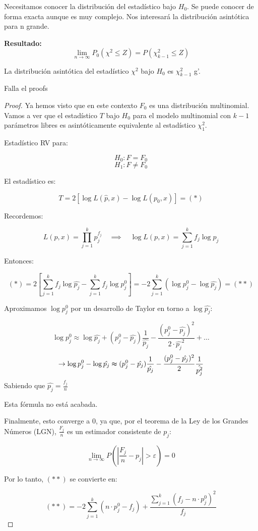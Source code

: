  Necesitamos conocer la distribución del estadístico bajo $H_0$.
 Se puede conocer de forma exacta aunque es muy complejo. Nos interesará la distribución asintótica para n grande.

 \textbf{Resultado:}
 \[
 \lim_{n \to \infty} P_0(\chi^2 \leq Z)=P(\chi^2_{k-1} \leq Z)
 \]

La distribución asintótica del estadístico $\chi^2$ bajo $H_0$ es $\chi^2_{k-1}$ g'.

Falla el proofs
\begin{proof}
Ya hemos visto que en este contexto \( F_0 \) es una distribución multinomial. 
Vamos a ver que el estadístico \( T \) bajo \( H_0 \) para el modelo multinomial con \( k-1 \) parámetros libres es asintóticamente equivalente al estadístico \( \chi^2_1 \).

Estadístico RV para:

\[
H_0: F = F_0
\]
\[
H_1: F \neq F_0
\]

El estadístico es:

\[
T = 2 \left[\log L(\hat{p}, x) - \log L(p_0, x)\right] = (*)
\]

Recordemos:

\[
L(p, x) = \prod_{j=1}^{k} p_j^{f_j} \quad \implies \quad \log L(p, x) = \sum_{j=1}^{k} f_j \log p_j
\]

Entonces:

\[
(*) = 2 \left[ \sum_{j=1}^{k} f_j \log \hat{p_j} - \sum_{j=1}^{k} f_j \log p_j^0 \right] 
= -2 \sum_{j=1}^{k} \left( \log p_j^0 - \log \hat{p_j} \right) = (**)
\]

Aproximamos \( \log p_j^0 \) por un desarrollo de Taylor en torno a \( \log \hat{p_j} \):

\[
\log p_j^0 \approx \log \hat{p_j} + (p_j^0 - \hat{p_j}) \frac{1}{\hat{p_j}} - \frac{(p_j^0 - \hat{p_j})^2}{2 \cdot \hat{p_j}^2}+ \dots
\]
\[
\to \log p_j^0- \log \hat{p_j}\thickapprox (p^0_j-\hat{p_j}) \frac{1}{\hat{p_j}}- \frac{(p^0_j-\hat{p_j})^2}{2}\frac{1}{\hat{p_j^2}}
\]
Sabiendo que $\hat{p_j}=\frac{f_j}{n}$

Esta fórmula no está acabada.

Finalmente, esto converge a 0, ya que, por el teorema de la Ley de los Grandes Números (LGN), \( \frac{F_j}{n} \) es un estimador consistente de \( p_j \):

\[
\lim_{n \to \infty} P \left( \left| \frac{F_j}{n} - p_j \right| > \varepsilon \right) = 0
\]

Por lo tanto, \( (**) \) se convierte en:

\[
(**) = -2 \sum_{j=1}^{k} \left( n \cdot p_j^0 - f_j \right) + \frac{\sum_{j=1}^{k} (f_j - n \cdot p_j^0)^2}{f_j}
\]

\end{proof}


